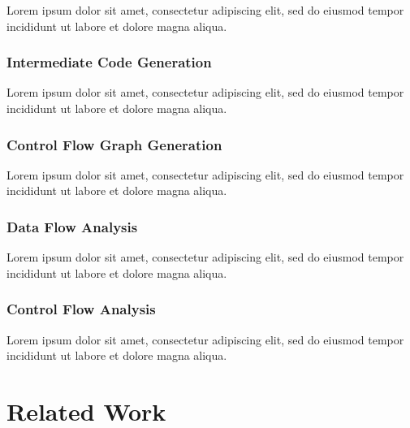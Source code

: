 \documentclass[12pt, a4paper]{article}
\begin{document}
Lorem ipsum dolor sit amet, consectetur adipiscing elit, sed do eiusmod tempor incididunt ut labore et dolore magna aliqua.


\subsubsection{Intermediate Code Generation}

Lorem ipsum dolor sit amet, consectetur adipiscing elit, sed do eiusmod tempor incididunt ut labore et dolore magna aliqua.


\subsubsection{Control Flow Graph Generation}

Lorem ipsum dolor sit amet, consectetur adipiscing elit, sed do eiusmod tempor incididunt ut labore et dolore magna aliqua.


\subsubsection{Data Flow Analysis}

Lorem ipsum dolor sit amet, consectetur adipiscing elit, sed do eiusmod tempor incididunt ut labore et dolore magna aliqua.

\cite{type_decomp}


\subsubsection{Control Flow Analysis}

Lorem ipsum dolor sit amet, consectetur adipiscing elit, sed do eiusmod tempor incididunt ut labore et dolore magna aliqua.


\section{Related Work}
\end{document}
